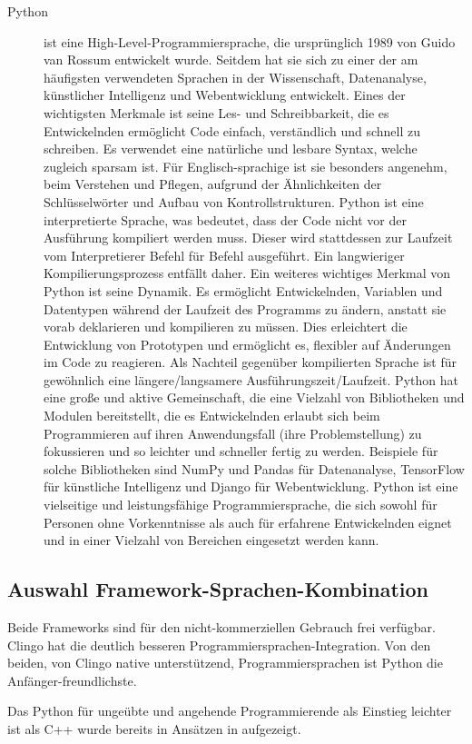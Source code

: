 \begin{description}
    \item[Python] ist eine High-Level-Programmiersprache, die ursprünglich 1989 von Guido van Rossum entwickelt wurde.
    Seitdem hat sie sich zu einer der am häufigsten verwendeten Sprachen in der Wissenschaft, Datenanalyse, künstlicher Intelligenz und Webentwicklung entwickelt.
    Eines der wichtigsten Merkmale ist seine Les- und Schreibbarkeit, die es Entwickelnden ermöglicht Code einfach, verständlich und schnell zu schreiben.
    Es verwendet eine natürliche und lesbare Syntax, welche zugleich sparsam ist.
    Für Englisch-sprachige ist sie besonders angenehm, beim Verstehen und Pflegen, aufgrund der Ähnlichkeiten der Schlüsselwörter und Aufbau von Kontrollstrukturen.
    Python ist eine interpretierte Sprache, was bedeutet, dass der Code nicht vor der Ausführung kompiliert werden muss.
    Dieser wird stattdessen zur Laufzeit vom \sog Interpretierer Befehl für Befehl ausgeführt.
    Ein \ggf langwieriger Kompilierungsprozess entfällt daher.
    Ein weiteres wichtiges Merkmal von Python ist seine Dynamik.
    Es ermöglicht Entwickelnden, Variablen und Datentypen während der Laufzeit des Programms zu ändern, anstatt sie vorab deklarieren und kompilieren zu müssen.
    Dies erleichtert die Entwicklung von Prototypen und ermöglicht es, flexibler auf Änderungen im Code zu reagieren.
    Als Nachteil gegenüber kompilierten Sprache ist für gewöhnlich eine längere/langsamere Ausführungszeit/Laufzeit.
    Python hat eine große und aktive Gemeinschaft, die eine Vielzahl von Bibliotheken und Modulen bereitstellt, die es Entwickelnden erlaubt sich beim Programmieren auf ihren Anwendungsfall (ihre Problemstellung) zu fokussieren und so leichter und schneller fertig zu werden.
    Beispiele für solche Bibliotheken sind NumPy und Pandas für Datenanalyse, TensorFlow für künstliche Intelligenz und Django für Webentwicklung.
    Python ist eine vielseitige und leistungsfähige Programmiersprache, die sich sowohl für Personen ohne Vorkenntnisse als auch für erfahrene Entwickelnden eignet und in einer Vielzahl von Bereichen eingesetzt werden kann.
\end{description}


\subsection{Auswahl Framework-Sprachen-Kombination}\label{subsec:auswahl-framework-sprachen-kombination}

{\color{red} %
Beide Frameworks sind für den nicht-kommerziellen Gebrauch frei verfügbar.
Clingo hat die deutlich besseren Programmiersprachen-Integration.
Von den beiden, von Clingo native unterstützend, Programmiersprachen ist Python die Anfänger-freundlichste.

Das Python für ungeübte und angehende Programmierende als Einstieg leichter ist als C++ wurde bereits in Ansätzen in  aufgezeigt.
}

